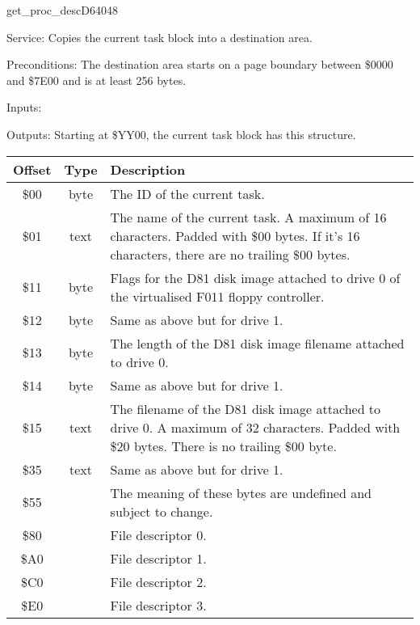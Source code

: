 \newpage
\begin{hyppotrap}{get\_proc\_desc}{D640}{48}
\item [Service:]
  Copies the current task block into a destination area.
\item [Preconditions:]
  The destination area starts on a page boundary between \$0000 and \$7E00 and
  is at least 256 bytes.
\item [Inputs:]
\item [Outputs:]
  Starting at \$YY00, the current task block has this structure.
  {\setlength{\tabcolsep}{2mm}
  \begin{tabular}{|c|c|p{6.9cm}|}
  \hline
  \textbf{Offset} & \textbf{Type} & \textbf{Description}
  \\\hline
  \$00 & byte & The ID of the current task.
  \\
  \$01 & text & The name of the current task. A maximum of 16 characters.
                Padded with \$00 bytes.
                If it's 16 characters, there are no trailing \$00 bytes.
  \\
  \$11 & byte & Flags for the D81 disk image attached to drive 0 of the
                virtualised F011 floppy controller.
  \\
  \$12 & byte & Same as above but for drive 1.
  \\
  \$13 & byte & The length of the D81 disk image filename attached to drive 0.
  \\
  \$14 & byte & Same as above but for drive 1.
  \\
  \$15 & text & The filename of the D81 disk image attached to drive 0.
                A maximum of 32 characters. Padded with \$20 bytes.
                There is no trailing \$00 byte.
  \\
  \$35 & text & Same as above but for drive 1.
  \\
  \$55 & & The meaning of these bytes are undefined and subject to change.
  \\
  \$80 & & File descriptor 0.
  \\
  \$A0 & & File descriptor 1.
  \\
  \$C0 & & File descriptor 2.
  \\
  \$E0 & & File descriptor 3.
  \\\hline
  \end{tabular}
  }


\end{hyppotrap}
